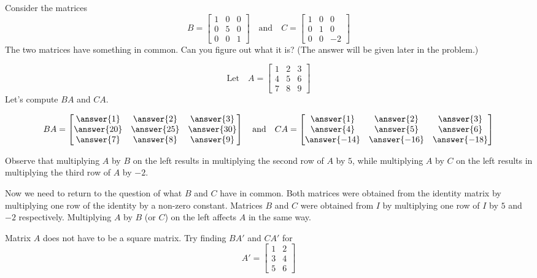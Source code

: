 \documentclass{ximera}
\begin{document}
\begin{exploration}\label{init:elementarymat2}
Consider the matrices
$$B = \begin{bmatrix}  
 1&0&0\\0&5&0\\0&0&1
 \end{bmatrix}
 \quad \text{and}\quad
 C = \begin{bmatrix}  
 1&0&0\\0&1&0\\0&0&-2
 \end{bmatrix}
$$
The two matrices have something in common.  Can you figure out what it is?  (The answer will be given later in the problem.)

$$\text{Let}\quad A = \begin{bmatrix}  
 1&2&3\\4&5&6\\7&8&9
 \end{bmatrix}$$
Let's compute $BA$ and $CA$.

$$BA=\begin{bmatrix}\answer{1} & \answer{2} & \answer{3} \\ \answer{20} & \answer{25} & \answer{30}\\ \answer{7} & \answer{8} & \answer{9}\end{bmatrix}
\quad
\text{and}
\quad
CA=\begin{bmatrix}\answer{1} & \answer{2} & \answer{3} \\ \answer{4} & \answer{5} & \answer{6}\\ \answer{-14} & \answer{-16} & \answer{-18}\end{bmatrix}$$

Observe that multiplying $A$ by $B$ on the left results in multiplying the second row of $A$ by $5$, while multiplying $A$ by $C$ on the left results in multiplying the third row of $A$ by $-2$.

Now we need to return to the question of what $B$ and $C$ have in common.  Both matrices were obtained from the identity matrix by multiplying one row of the identity by a non-zero constant.  Matrices $B$ and $C$ were obtained from $I$ by multiplying one row of $I$ by $5$ and $-2$ respectively.  Multiplying $A$ by $B$ (or $C$) on the left affects $A$ in the same way.

Matrix $A$ does not have to be a square matrix.  Try finding $BA'$ and $CA'$ for 
$$A'=\begin{bmatrix}1&2\\3&4\\5&6\end{bmatrix}$$


\end{exploration}
\end{document}
